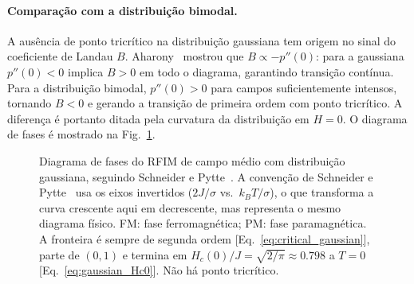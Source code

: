 \documentclass[12pt,a4paper]{article}
\begin{document}
\paragraph{Comparação com a distribuição bimodal.}
A ausência de ponto tricrítico na distribuição gaussiana tem origem
no sinal do coeficiente de Landau $B$. Aharony~\cite{Aharony1978a}
mostrou que $B \propto -p''(0)$: para a gaussiana $p''(0)<0$
implica $B>0$ em todo o diagrama, garantindo transição contínua.
Para a distribuição bimodal, $p''(0)>0$ para campos suficientemente
intensos, tornando $B<0$ e gerando a transição de primeira ordem
com ponto tricrítico. A diferença é portanto ditada pela curvatura
da distribuição em $H=0$. O diagrama de fases é mostrado na Fig.~\ref{fig:rfim_gaussian_phase_diagram}.
%
\begin{figure}[H]
\centering
{}
\caption{Diagrama de fases do RFIM de campo médio com distribuição
gaussiana, seguindo Schneider e Pytte~\cite{SchneiderPytte1977}. A convenção de Schneider e Pytte~\cite{SchneiderPytte1977} usa os eixos invertidos ($2J/\sigma$ vs.\ $k_BT/\sigma$),
o que transforma a curva crescente aqui em decrescente, mas
representa o mesmo diagrama físico. FM: fase ferromagnética; PM: fase paramagnética. A fronteira é sempre de segunda ordem [Eq.~\eqref{eq:critical_gaussian}],
parte de $(0,1)$ e termina em $H_c(0)/J=\sqrt{2/\pi}\approx0.798$
a $T=0$ [Eq.~\eqref{eq:gaussian_Hc0}].
Não há ponto tricrítico.}
\label{fig:rfim_gaussian_phase_diagram}
\end{figure}
%
\end{document}
